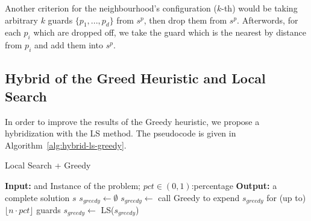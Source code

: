 \documentclass[runningheads,a4paper]{llncs}
\begin{document}
      Another criterion for the neighbourhood's configuration ($k$-th) would be taking arbitrary $k$ guards $\{p_1,...,p_d\}$ from $s^p$, then drop them from $s^p$. Afterwords, for each $p_i$ which are dropped off, we take the guard which is the nearest by distance from $p_i$ and add them into $s^p$.
      
      \subsection{Hybrid of the Greed Heuristic and Local Search}

       In order to improve the results of the Greedy heuristic, we propose a hybridization with the LS method. 
       The pseudocode is given in Algorithm~\ref{alg:hybrid-ls-greedy}.
        \begin{algorithm}[!t]
       	\caption{Local Search + Greedy}\label{alg:hybrid-ls-greedy}
       	\begin{algorithmic}
       		   	\State \textbf{Input:} and Instance of the problem; $pct\in (0,1)$:percentage
       		    \State \textbf{Output:} a complete solution $s$
       		    \State $s_{greedy} \gets \emptyset$
       		        \State $s_{greedy} \gets$ call Greedy to expend $s_{greedy}$ for (up to) $\lfloor n \cdot pct \rfloor$ guards 
       		        \State $s_{greedy} \gets$ LS($s_{greedy}$)
       		    \EndWhile
       \end{algorithmic}
       \end{algorithm}	
         
\end{document}
